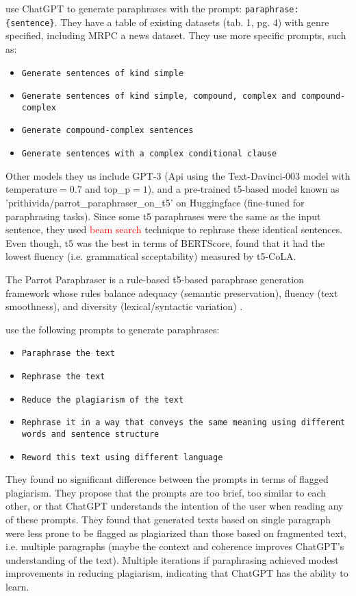 \citet{kurt_pehlivanoglu_comparative_2024} use ChatGPT to generate paraphrases with the prompt:
\texttt{paraphrase:\{sentence\}}.
They have a table of existing datasets (tab. 1, pg. 4) with genre specified, including MRPC a news dataset.
They use more specific prompts, such as:
\begin{itemize}
    \item \texttt{Generate sentences of kind simple}
    \item \texttt{Generate sentences of kind simple, compound, complex and compound-complex}
    \item \texttt{Generate compound-complex sentences}
    \item \texttt{Generate sentences with a complex conditional clause}
\end{itemize}
Other models they us include GPT-3 (Api using the Text-Davinci-003 model with temperature$=0.7$ and top\_p$=1$), 
and a pre-trained \ac{t5}-based model known as 'prithivida/parrot\_paraphraser\_on\_\ac{t5}' on Huggingface (fine-tuned for paraphrasing tasks).
Since some \ac{t5} paraphrases were the same as the input sentence, they used \textcolor{red}{beam search} technique to rephrase these identical sentences.
Even though, \ac{t5} was the best in terms of BERTScore, 
\citet{kurt_pehlivanoglu_comparative_2024} found that it had the lowest fluency (i.e. grammatical scceptability) measured by \ac{t5}-CoLA.

The Parrot Paraphraser is a rule-based \ac{t5}-based paraphrase generation framework whose 
rules balance adequacy (semantic preservation), fluency (text smoothness), and diversity (lexical/syntactic variation) \citep{zhou_paraphrase_2025}.

\citet{hassanipour_ability_2024} use the following prompts to generate paraphrases:
\begin{itemize}
    \item \texttt{Paraphrase the text}
    \item \texttt{Rephrase the text}
    \item \texttt{Reduce the plagiarism of the text}
    \item \texttt{Rephrase it in a way that conveys the same meaning using different words and sentence structure}
    \item \texttt{Reword this text using different language}
\end{itemize}
They found no significant difference between the prompts in terms of flagged plagiarism.
They propose that the prompts are too brief, too similar to each other, or that ChatGPT understands the intention of the user when reading any of these prompts.
They found that generated texts based on single paragraph were less prone to be flagged as plagiarized than those based on fragmented text, i.e. multiple paragraphs
(maybe the context and coherence improves ChatGPT's understanding of the text).
Multiple iterations if paraphrasing achieved modest improvements in reducing plagiarism, indicating that ChatGPT has the ability to learn.

